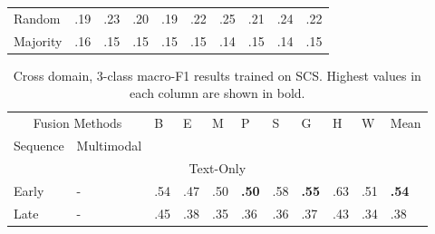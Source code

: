 \documentclass{article}
\begin{document}
\begin{table}[H]
\begin{tabular}{|lllllllllll|}
\multicolumn{2}{|l|}{Random}                                                      & .19                & .23                & .20                & .19                & .22                & .25                & .21                & \multicolumn{1}{l|}{.24}                & .22                   \\
\multicolumn{2}{|l|}{Majority}                                                    & .16                & .15                & .15                & .15                & .15                & .14                & .15                & \multicolumn{1}{l|}{.14}                & .15                   \\ \hline
\end{tabular}
\end{table}

\begin{table}[H]
\centering
\caption{Cross domain, 3-class macro-F1 results trained on SCS. Highest values in each column are shown in bold.}
\begin{tabular}{|lllllllllll|}
\hline
\multicolumn{2}{|c|}{Fusion Methods}                                              & \multirow{2}{*}{B} & \multirow{2}{*}{E} & \multirow{2}{*}{M} & \multirow{2}{*}{P} & \multirow{2}{*}{S} & \multirow{2}{*}{G} & \multirow{2}{*}{H} & \multicolumn{1}{l|}{\multirow{2}{*}{W}} & \multirow{2}{*}{Mean} \\ \cline{1-2}
\multicolumn{1}{|l|}{Sequence}               & \multicolumn{1}{l|}{Multimodal}    &                    &                    &                    &                    &                    &                    &                    & \multicolumn{1}{l|}{}                   &                       \\ \hline
\multicolumn{11}{|c|}{Text-Only}                                                                                                                                                                                                                                                                       \\ \hline
\multicolumn{1}{|l|}{Early}                  & \multicolumn{1}{l|}{-}             & .54                & .47                & .50                & \textbf{.50}       & .58                & \textbf{.55}       & .63                & \multicolumn{1}{l|}{.51}                & \textbf{.54}          \\
\multicolumn{1}{|l|}{Late}                   & \multicolumn{1}{l|}{-}             & .45                & .38                & .35                & .36                & .36                & .37                & .43                & \multicolumn{1}{l|}{.34}                & .38                   \\ \hline

\end{tabular}
\end{table}
\end{document}
